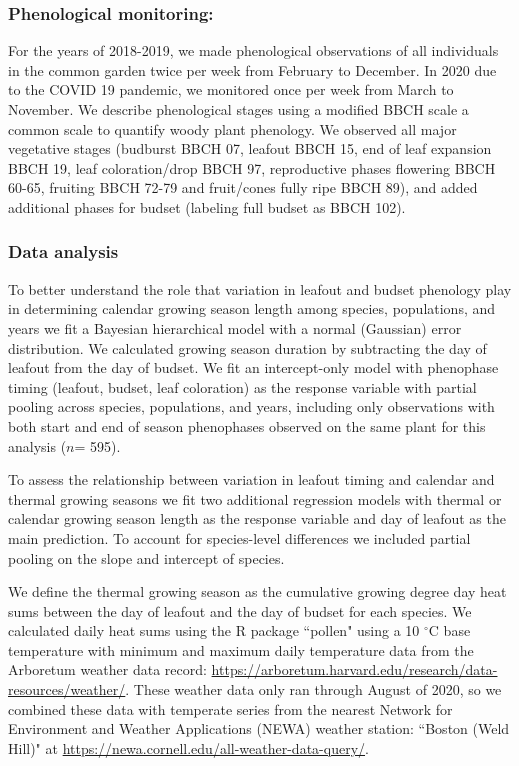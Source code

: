\documentclass{article}[12pt]
\begin{document}
\subsubsection*{Phenological monitoring:}
For the years of 2018-2019, we made phenological observations of all individuals in the common garden twice per week from February to December. In 2020 due to the COVID 19 pandemic, we monitored once per week from March to November. We describe phenological stages using a modified BBCH scale \citep{Finn2007} a common scale to quantify woody plant phenology. We observed all major vegetative stages (budburst BBCH 07, leafout BBCH 15, end of leaf expansion BBCH 19, leaf coloration/drop BBCH 97, reproductive phases flowering BBCH 60-65, fruiting BBCH 72-79 and fruit/cones fully ripe BBCH 89), and added additional phases for budset (labeling full budset as BBCH 102). 

\subsubsection*{Data analysis}
To better understand the role that variation in leafout and budset phenology play in determining calendar growing season length among species, populations, and years we fit a Bayesian hierarchical model with a normal (Gaussian) error distribution. We calculated growing season duration by subtracting the day of leafout from the day of budset. We fit an intercept-only model with phenophase timing (leafout, budset, leaf coloration) as the response variable with partial pooling across species, populations, and years, including only observations with both start and end of season phenophases observed on the same plant for this analysis ($n$= 595).

To assess the relationship between variation in leafout timing and calendar and thermal growing seasons we fit two additional regression models with thermal or calendar growing season length as the response variable and day of leafout as the main prediction. To account for species-level differences we included partial pooling on the slope and intercept of species.

We define the thermal growing season as the cumulative growing degree day heat sums between the day of leafout and the day of budset for each species. We calculated daily heat sums using the R package ``pollen" \citep{Nowosad2019} using a 10 $^\circ$C base temperature with minimum and maximum daily temperature data from the Arboretum weather data record: \href{https://arboretum.harvard.edu/research/data-resources/weather/}{https://arboretum.harvard.edu/research/data-resources/weather/}. These weather data only ran through August of 2020, so we combined these data with temperate series from the nearest Network for Environment and Weather Applications (NEWA) weather station: ``Boston (Weld Hill)" at \href{https://newa.cornell.edu/all-weather-data-query/}{https://newa.cornell.edu/all-weather-data-query/}. 
\end{document}
